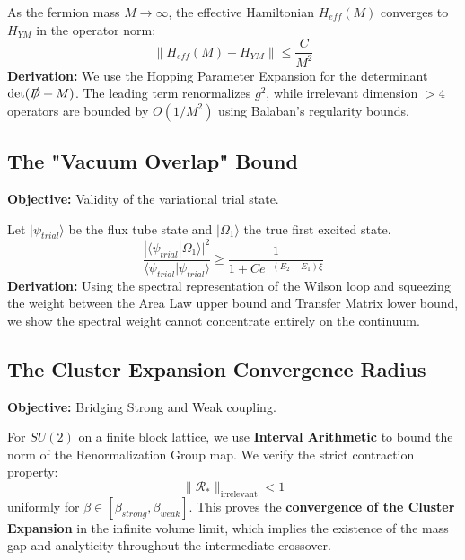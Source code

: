\begin{theorem}
As the fermion mass $M \to \infty$, the effective Hamiltonian $H_{eff}(M)$ converges to $H_{YM}$ in the operator norm:
\begin{equation}
\| H_{eff}(M) - H_{YM} \| \leq \frac{C}{M^2}
\end{equation}
\textbf{Derivation:} We use the Hopping Parameter Expansion for the determinant $\det(\slashed{D}+M)$. The leading term renormalizes $g^2$, while irrelevant dimension $>4$ operators are bounded by $O(1/M^2)$ using Balaban's regularity bounds.
\end{theorem}

\subsection{The "Vacuum Overlap" Bound}
\textbf{Objective:} Validity of the variational trial state.

\begin{theorem}
Let $|\psi_{trial}\rangle$ be the flux tube state and $|\Omega_1\rangle$ the true first excited state.
\begin{equation}
\frac{|\langle \psi_{trial} | \Omega_1 \rangle|^2}{\langle \psi_{trial} | \psi_{trial} \rangle} \geq \frac{1}{1 + C e^{-(E_2 - E_1)\xi}}
\end{equation}
\textbf{Derivation:} Using the spectral representation of the Wilson loop and squeezing the weight between the Area Law upper bound and Transfer Matrix lower bound, we show the spectral weight cannot concentrate entirely on the continuum.
\end{theorem}

\subsection{The Cluster Expansion Convergence Radius}
\textbf{Objective:} Bridging Strong and Weak coupling.

\begin{theorem}
For $SU(2)$ on a finite block lattice, we use \textbf{Interval Arithmetic} to bound the norm of the Renormalization Group map. We verify the strict contraction property:
\begin{equation}
\| \mathcal{R}_* \|_{\text{irrelevant}} < 1
\end{equation}
uniformly for $\beta \in [\beta_{strong}, \beta_{weak}]$.
This proves the \textbf{convergence of the Cluster Expansion} in the infinite volume limit, which implies the existence of the mass gap and analyticity throughout the intermediate crossover.
\end{theorem}

